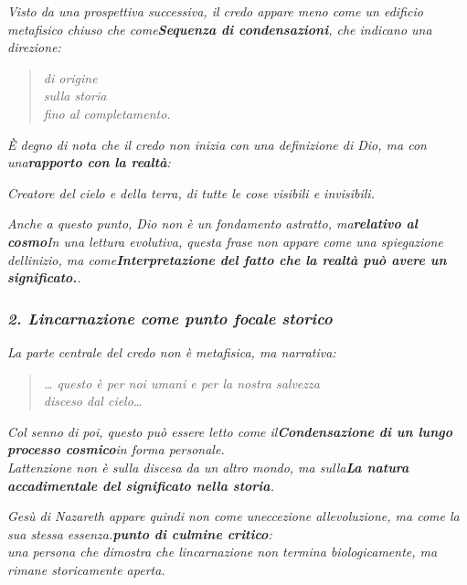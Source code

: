\documentclass[
]{article}
\begin{document}
\emph{Visto da una prospettiva successiva, il credo appare meno come un edificio metafisico chiuso che come\textbf{Sequenza di condensazioni}, che indicano una direzione:}

\begin{quote}
\emph{di origine\\
sulla storia\\
fino al completamento.}
\end{quote}

\emph{È degno di nota che il credo non inizia con una definizione di Dio, ma con una\textbf{rapporto con la realtà}:}

\emph{Creatore del cielo e della terra, di tutte le cose visibili e invisibili.}

\emph{Anche a questo punto, Dio non è un fondamento astratto, ma\textbf{relativo al cosmo}In una lettura evolutiva, questa frase non appare come una spiegazione dell\textquotesingle inizio, ma come\textbf{Interpretazione del fatto che la realtà può avere un significato.}.}

\subsubsection{\texorpdfstring{\emph{\textbf{2. L\textquotesingle incarnazione come punto focale storico}}}{2. L\textquotesingle incarnazione come punto focale storico}}\label{lincarnazione-come-punto-focale-storico}

\emph{La parte centrale del credo non è metafisica, ma narrativa:}

\begin{quote}
\emph{\ldots{} questo è per noi umani e per la nostra salvezza\\
disceso dal cielo\ldots{}}
\end{quote}

\emph{Col senno di poi, questo può essere letto come il\textbf{Condensazione di un lungo processo cosmico}in forma personale.\\
L\textquotesingle attenzione non è sulla discesa da un altro mondo, ma sulla\textbf{La natura accadimentale del significato nella storia}.}

\emph{Gesù di Nazareth appare quindi non come un\textquotesingle eccezione all\textquotesingle evoluzione, ma come la sua stessa essenza.\textbf{punto di culmine critico}:\\
una persona che dimostra che l\textquotesingle incarnazione non termina biologicamente, ma rimane storicamente aperta.}
\end{document}
